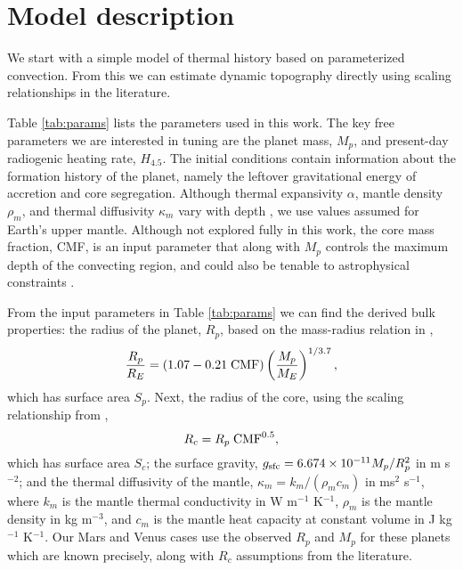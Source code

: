 \section{Model description}\label{sec:methods}









We start with a simple model of thermal history based on parameterized convection. From this we can estimate dynamic topography directly using scaling relationships in the literature. 

Table \ref{tab:params} lists the parameters used in this work. The key free parameters we are interested in tuning are the planet mass, $M_p$, and present-day radiogenic heating rate, $H_{4.5}$. The initial conditions contain information about the formation history of the planet, namely the leftover gravitational energy of accretion and core segregation. Although thermal expansivity $\alpha$, mantle density $\rho_m$, and thermal diffusivity $\kappa_m$ vary with depth \citep{Anderson1987}, we use values assumed for Earth's upper mantle. Although not explored fully in this work, the core mass fraction, CMF, is an input parameter that along with $M_p$ controls the maximum depth of the convecting region, and could also be tenable to astrophysical constraints \citep{Suissa2018}.

From the input parameters in Table \ref{tab:params} we can find the derived bulk properties: the radius of the planet, $R_p$, based on the mass-radius relation in \citet{Zeng2016},
\begin{equation}
\frac{R_p}{R_E} = (1.07 - 0.21\; {\rm CMF})\left(\frac{M_p}{M_E}\right)^{1/3.7},
\end{equation}
which has surface area $S_p$. Next, the radius of the core, using the scaling relationship from \citet{Zeng2017},
\begin{equation}
R_c = R_p \; {\rm CMF}^{0.5},
\end{equation}
which has surface area $S_c$; the surface gravity, $g_{\rm sfc} = 6.674\times 10^{-11}M_p/R_p^2$ in m s$^{-2}$; and the thermal diffusivity of the mantle, $\kappa_m = k_m/(\rho_m c_m)$ in ms$^{2}$ s$^{-1}$, where $k_m$ is the mantle thermal conductivity in W m$^{-1}$ K$^{-1}$, $\rho_m$ is the mantle density in kg m$^{-3}$, and $c_m$ is the mantle heat capacity at constant volume in J kg$^{-1}$ K$^{-1}$. Our Mars and Venus cases use the observed $R_p$ and $M_p$ for these planets which are known precisely, along with $R_c$ assumptions from the literature. 


